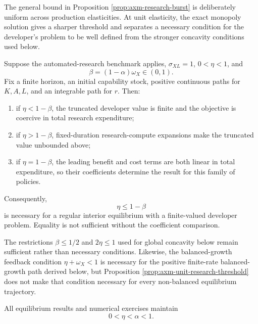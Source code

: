 The general bound in Proposition \ref{prop:axm-research-burst} is deliberately
uniform across production elasticities. At unit elasticity, the exact monopoly
solution gives a sharper threshold and separates a necessary condition for the
developer's problem to be well defined from the stronger concavity conditions
used below.

\begin{proposition}
\label{prop:axm-unit-research-threshold}
Suppose the automated-research benchmark applies, \(\sigma_{XL}=1\),
\(0<\eta<1\), and
\[
 \beta=(1-\alpha)\omega_X\in(0,1).
\]
Fix a finite horizon, an initial capability stock, positive continuous paths
for \(K,A,L\), and an integrable path for \(r\). Then:
\begin{enumerate}
 \item if \(\eta<1-\beta\), the truncated developer value is finite and the
 objective is coercive in total research expenditure;
 \item if \(\eta>1-\beta\), fixed-duration research-compute expansions make
 the truncated value unbounded above;
 \item if \(\eta=1-\beta\), the leading benefit and cost terms are both linear
 in total expenditure, so their coefficients determine the result for this
 family of policies.
\end{enumerate}
Consequently,
\begin{equation}
 \eta\leq1-\beta
 \label{eq:axm-unit-necessary-research-threshold}
\end{equation}
is necessary for a regular interior equilibrium with a finite-valued developer
problem. Equality is not sufficient without the coefficient comparison.
\end{proposition}

The restrictions \(\beta\leq1/2\) and \(2\eta\leq1\) used for global
concavity below remain sufficient rather than necessary conditions. Likewise,
the balanced-growth feedback condition \(\eta+\omega_X<1\) is necessary for
the positive finite-rate balanced-growth path derived below, but Proposition
\ref{prop:axm-unit-research-threshold} does not make that condition necessary
for every non-balanced equilibrium trajectory.

\begin{assumption}
\label{ass:axm-large-scale-curvature}
All equilibrium results and numerical exercises maintain
\begin{equation}
 0<\eta<\alpha<1.
 \label{eq:axm-large-scale-curvature}
\end{equation}
\end{assumption}

